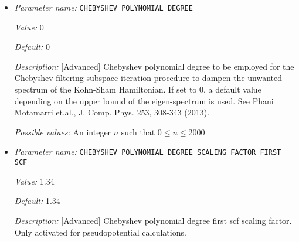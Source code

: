 \begin{itemize}
{\it Value:} 0.0


{\it Default:} 0.0


{\it Description:} [Advanced] Parameter specifying the accuracy of the occupied eigenvectors close to the Fermi-energy computed using Chebyshev filtering subspace iteration procedure. For default value of 0.0, we heuristically set the value between 1e-3 and 5e-2 depending on the MIXING METHOD used.


{\it Possible values:} A floating point number $v$ such that $-1e-12 \leq v \leq \text{MAX\_DOUBLE}$
\item {\it Parameter name:} {\tt CHEBYSHEV POLYNOMIAL DEGREE}
\label{parameters:SCF parameters/Eigen_2dsolver parameters/CHEBYSHEV POLYNOMIAL DEGREE}
\label{parameters:SCF_20parameters/Eigen_2dsolver_20parameters/CHEBYSHEV_20POLYNOMIAL_20DEGREE}


{\it Value:} 0


{\it Default:} 0


{\it Description:} [Advanced] Chebyshev polynomial degree to be employed for the Chebyshev filtering subspace iteration procedure to dampen the unwanted spectrum of the Kohn-Sham Hamiltonian. If set to 0, a default value depending on the upper bound of the eigen-spectrum is used. See Phani Motamarri et.al., J. Comp. Phys. 253, 308-343 (2013).


{\it Possible values:} An integer $n$ such that $0\leq n \leq 2000$
\item {\it Parameter name:} {\tt CHEBYSHEV POLYNOMIAL DEGREE SCALING FACTOR FIRST SCF}
\label{parameters:SCF parameters/Eigen_2dsolver parameters/CHEBYSHEV POLYNOMIAL DEGREE SCALING FACTOR FIRST SCF}
\label{parameters:SCF_20parameters/Eigen_2dsolver_20parameters/CHEBYSHEV_20POLYNOMIAL_20DEGREE_20SCALING_20FACTOR_20FIRST_20SCF}


{\it Value:} 1.34


{\it Default:} 1.34


{\it Description:} [Advanced] Chebyshev polynomial degree first scf scaling factor. Only activated for pseudopotential calculations.



\end{itemize}
